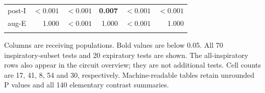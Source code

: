 \begin{table}[htbp]
\begin{tabular}{@{}lrrrrr@{}}
post-I & $\boldsymbol{<0.001}$ & $\boldsymbol{<0.001}$ & \textbf{0.007} & $\boldsymbol{<0.001}$ & $\boldsymbol{<0.001}$ \\
aug-E & 1.000 & $\boldsymbol{<0.001}$ & 1.000 & $\boldsymbol{<0.001}$ & 1.000 \\
\addlinespace
\bottomrule
\end{tabular}
\par\smallskip\begin{minipage}{\linewidth}\footnotesize Columns are receiving populations. Bold values are below 0.05. All 70 inspiratory-subset tests and 20 expiratory tests are shown. The all-inspiratory rows also appear in the circuit overview; they are not additional tests. Cell counts are 17, 41, 8, 54 and 30, respectively. Machine-readable tables retain unrounded P values and all 140 elementary contrast summaries.\end{minipage}
\end{table}
